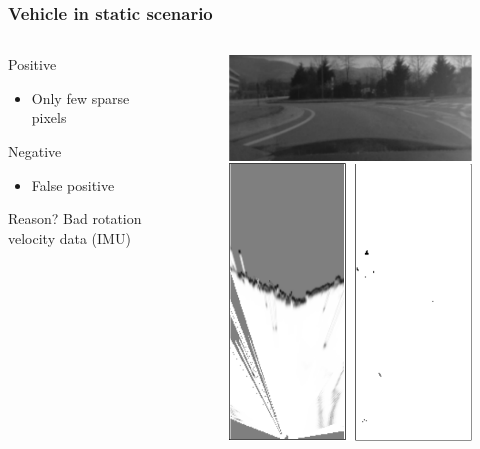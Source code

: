 \documentclass{beamer}
\begin{document}
	\begin{frame}
		\frametitle{Vehicle in static scenario}
		
		\begin{columns}[t]
			\begin{column}[t]{5cm}
				\begin{exampleblock}{Positive}
				\begin{itemize}
				\item Only few sparse pixels
				\end{itemize}
				\end{exampleblock}
								
				\begin{alertblock}{Negative}
				\begin{itemize}
				\item False positive
				\end{itemize}
				\end{alertblock}					
		
				\begin{block}{Reason?}
				Bad rotation velocity data (IMU)
				\end{block}					
			\end{column}
			\begin{column}[t]{5cm}
				\begin{figure}[h]
				\center
				\includegraphics[scale=0.55]{../img/fig:result:scenestatic}
				\end{figure}
			\end{column}
		\end{columns}
	\end{frame}			
\end{document}
